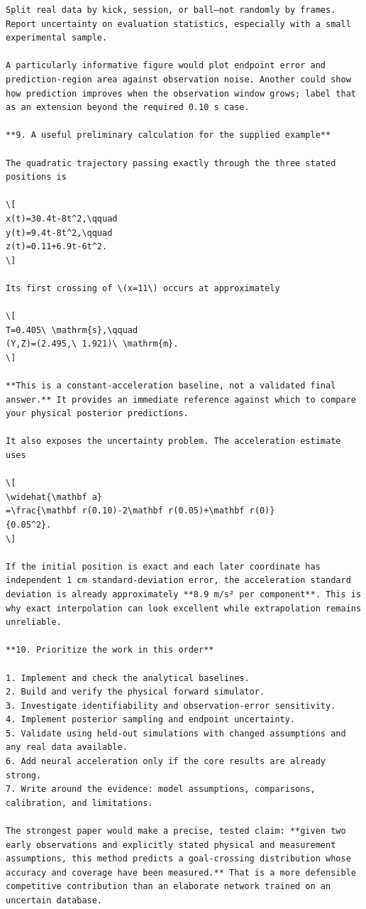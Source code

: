 \documentclass[UTF8,10pt]{ctexart}
\begin{document}
\begin{Verbatim}[breaklines=true,breakanywhere=true,fontsize=\scriptsize,frame=single,framesep=2pt]
Split real data by kick, session, or ball—not randomly by frames. Report uncertainty on evaluation statistics, especially with a small experimental sample.

A particularly informative figure would plot endpoint error and prediction-region area against observation noise. Another could show how prediction improves when the observation window grows; label that as an extension beyond the required 0.10 s case.

**9. A useful preliminary calculation for the supplied example**

The quadratic trajectory passing exactly through the three stated positions is

\[
x(t)=30.4t-8t^2,\qquad
y(t)=9.4t-8t^2,\qquad
z(t)=0.11+6.9t-6t^2.
\]

Its first crossing of \(x=11\) occurs at approximately

\[
T=0.405\ \mathrm{s},\qquad
(Y,Z)=(2.495,\ 1.921)\ \mathrm{m}.
\]

**This is a constant-acceleration baseline, not a validated final answer.** It provides an immediate reference against which to compare your physical posterior predictions.

It also exposes the uncertainty problem. The acceleration estimate uses

\[
\widehat{\mathbf a}
=\frac{\mathbf r(0.10)-2\mathbf r(0.05)+\mathbf r(0)}
{0.05^2}.
\]

If the initial position is exact and each later coordinate has independent 1 cm standard-deviation error, the acceleration standard deviation is already approximately **8.9 m/s² per component**. This is why exact interpolation can look excellent while extrapolation remains unreliable.

**10. Prioritize the work in this order**

1. Implement and check the analytical baselines.
2. Build and verify the physical forward simulator.
3. Investigate identifiability and observation-error sensitivity.
4. Implement posterior sampling and endpoint uncertainty.
5. Validate using held-out simulations with changed assumptions and any real data available.
6. Add neural acceleration only if the core results are already strong.
7. Write around the evidence: model assumptions, comparisons, calibration, and limitations.

The strongest paper would make a precise, tested claim: **given two early observations and explicitly stated physical and measurement assumptions, this method predicts a goal-crossing distribution whose accuracy and coverage have been measured.** That is a more defensible competitive contribution than an elaborate network trained on an uncertain database.
\end{Verbatim}
\end{document}
